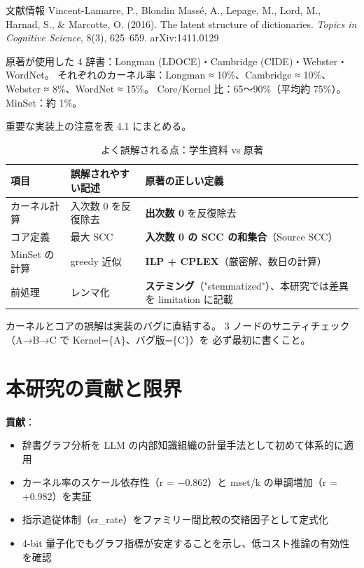 \documentclass[lang=jp, color=black, mode=simple, 11pt]{elegantbook}
\begin{document}
\begin{dsterm}{文献情報}
  Vincent-Lamarre, P., Blondin Massé, A., Lepage, M., Lord, M., Harnad, S., \& Marcotte, O. (2016).
  The latent structure of dictionaries.
  \textit{Topics in Cognitive Science}, 8(3), 625--659.
  arXiv:1411.0129
\end{dsterm}

原著が使用した 4 辞書：Longman (LDOCE)・Cambridge (CIDE)・Webster・WordNet。
それぞれのカーネル率：Longman ≈ 10\%、Cambridge ≈ 10\%、Webster ≈ 8\%、WordNet ≈ 15\%。
Core/Kernel 比：65〜90\%（平均約 75\%）。MinSet：約 1\%。

重要な実装上の注意を表 4.1 にまとめる。

\begin{table}[htbp]
\centering
\caption{よく誤解される点：学生資料 vs 原著}
\begin{tabular}{p{3.5cm}p{4cm}p{4cm}}
\toprule
項目 & 誤解されやすい記述 & 原著の正しい定義 \\
\midrule
カーネル計算 & 入次数 0 を反復除去 & \textbf{出次数 0} を反復除去 \\
コア定義 & 最大 SCC & \textbf{入次数 0 の SCC の和集合}（Source SCC） \\
MinSet の計算 & greedy 近似 & \textbf{ILP + CPLEX}（厳密解、数日の計算） \\
前処理 & レンマ化 & \textbf{ステミング}（"stemmatized"）、本研究では差異を limitation に記載 \\
\bottomrule
\end{tabular}
\end{table}

\begin{caution}
  カーネルとコアの誤解は実装のバグに直結する。
  3 ノードのサニティチェック（A→B→C で Kernel=\{A\}、バグ版=\{C\}）を
  必ず最初に書くこと。
\end{caution}

\section{本研究の貢献と限界}

\begin{note}
  \textbf{貢献}：
  \begin{itemize}
    \item 辞書グラフ分析を LLM の内部知識組織の計量手法として初めて体系的に適用
    \item カーネル率のスケール依存性（r = −0.862）と mset/k の単調増加（r = +0.982）を実証
    \item 指示追従体制（sr\_rate）をファミリー間比較の交絡因子として定式化
    \item 4-bit 量子化でもグラフ指標が安定することを示し、低コスト推論の有効性を確認
  \end{itemize}
\end{note}
\end{document}
